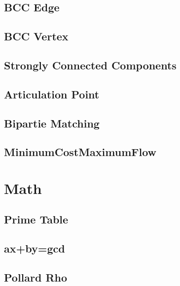 \documentclass[a4paper,10pt,twocolumn,oneside]{article}
\begin{document}
\subsection{BCC Edge}


\subsection{BCC Vertex}


\subsection{Strongly Connected Components}


\subsection{Articulation Point}


\subsection{Bipartie Matching}


\subsection{MinimumCostMaximumFlow}


\section{Math}
\subsection{Prime Table}


\subsection{ax+by=gcd}


\subsection{Pollard Rho}

\end{document}
